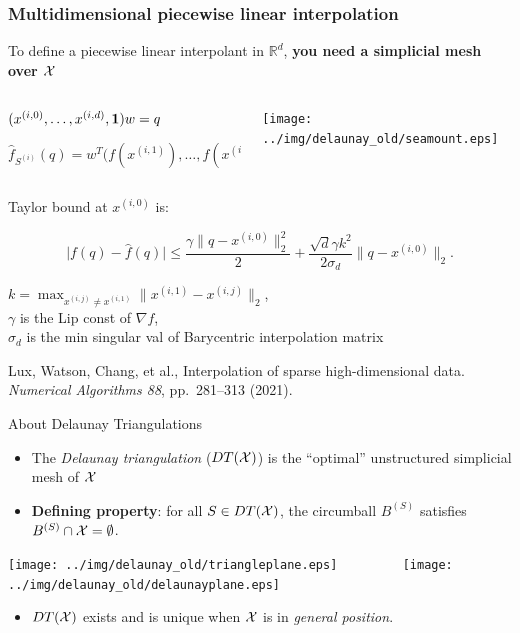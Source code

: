 \documentclass[aspectratio=169]{beamer}
\newcommand{\cmark}{\ding{51}}
\newcommand{\xmark}{\ding{55}}
\begin{document}
\begin{frame}
\frametitle{Multidimensional piecewise linear interpolation}

To define a piecewise linear interpolant in $\mathbb{R}^d$,
{\bf you need a simplicial mesh over ${\cal X}$}

\begin{columns}
\begin{column}{.62\textwidth}
$(x^{(i,0)}, \ldots, x^{(i,d)}, {\bf 1})w = q$

$$
{\hat f}_{S^{(i)}}(q) = w^T \big(f(x^{(i,1)}), \ldots, f(x^{(i,d)})\big).
$$

\end{column}
\begin{column}{.3\textwidth}
\hbox{\texttt{[image: ../img/delaunay\_old/seamount.eps]}}
\end{column}
\end{columns}

Taylor bound at $x^{(i,0)}$ is:

$$
\big|f(q) - \hat f(q)\big| \leq \frac{\gamma \|q - x^{(i,0)}\|_{2}^{2}}{2} + \frac{\sqrt{d}  \gamma k^{2}}{2 \sigma_{d}} \|q - x^{(i,0)}\|_{2}.
$$

{\small
$k = \max_{x^{(i,j)} \neq x^{(i,1)}} \|x^{(i,1)} - x^{(i,j)}\|_2$,\\
$\gamma$ is the Lip const of $\nabla f$,\\
$\sigma_d$ is the min singular val of Barycentric interpolation matrix}

\vfill

{\tiny Lux, Watson, Chang, et al.,
Interpolation of sparse high-dimensional data.
{\sl Numerical Algorithms 88}, pp.~281–313 (2021).}

\end{frame}

\begin{frame}{About Delaunay Triangulations}
\begin{itemize}
\item The {\it Delaunay triangulation} ($DT({\cal X})$)
is the ``optimal'' unstructured simplicial mesh of ${\cal X}$
\item {\bf Defining property}:
for all $S \in DT({\cal X})$, the circumball $B^{(S)}$
satisfies
$B^{(S)} \cap {\cal X} = \emptyset$.
\end{itemize}
\begin{center}
\texttt{[image: ../img/delaunay\_old/triangleplane.eps]}
\hskip 4pt{\color{red} \xmark}
$\qquad\qquad$
\texttt{[image: ../img/delaunay\_old/delaunayplane.eps]}
\hskip 4pt{\color{green} \cmark}
\end{center}
\begin{itemize}
\item $DT({\cal X})$ exists and is unique when ${\cal X}$ is in {\it general position}.
\end{itemize}
\end{frame}
\end{document}
